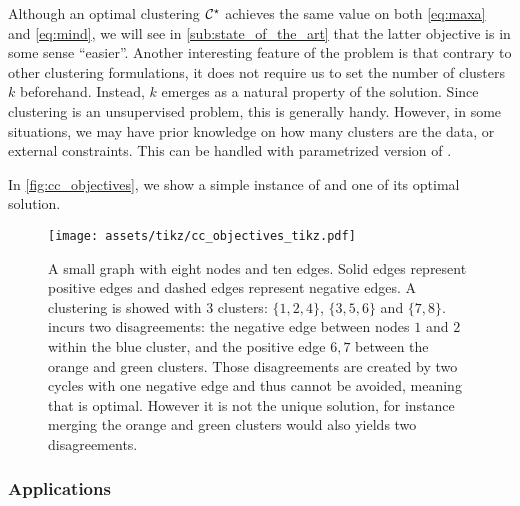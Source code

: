 Although an optimal clustering $\mathcal{C}^\star$ achieves the same value on both \eqref{eq:maxa}
and \eqref{eq:mind}, we will see in \autoref{sub:state_of_the_art} that the latter objective is in
some sense \enquote{easier}. Another interesting feature of the \pcc{} problem is that contrary to
other clustering formulations, it does not require us to set the number of clusters $k$ beforehand.
Instead, $k$ emerges as a natural property of the solution. Since clustering is an unsupervised
problem, this is generally handy. However, in some situations, we may have prior knowledge on how
many clusters are the data, or external constraints. This can be handled with parametrized version
of \pcc{} \autocites{Giotis2006}{Fomin2014}.

In \autoref{fig:cc_objectives}, we show a simple instance of \pcc{} and one of its optimal solution.
\begin{figure}[hbt]
	\centering
	\texttt{[image: assets/tikz/cc\_objectives\_tikz.pdf]}
	\caption[Small example of \pcc{}]{A small graph with eight nodes and ten edges. Solid edges
	represent positive edges and dashed edges represent negative edges. A clustering \cluster{}
	is showed with 3 clusters: $\{1, 2, 4\}$, $\{3, 5, 6\}$ and $\{7, 8\}$. \cluster{} incurs two
	disagreements: the negative edge between nodes $1$ and $2$ within the blue cluster, and the
	positive edge $6,7$ between the orange and green clusters. Those disagreements are created
	by two cycles with one negative edge and thus cannot be avoided, meaning that \cluster{} is
	optimal. However it is not the unique solution, for instance merging the orange and green
	clusters would also yields two disagreements.}
	\label{fig:cc_objectives}
\end{figure}

\subsubsection{Applications}
\label{ssub:cc_applications}


